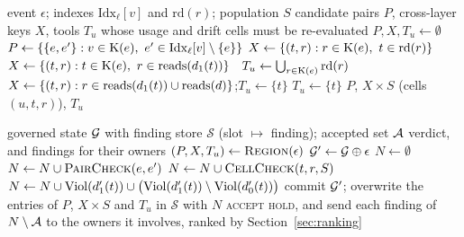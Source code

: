 \begin{algorithm}[t]
\caption{$\textsc{Region}(\epsilon)$: slots whose finding may change}\label{alg:region}
\begin{algorithmic}[1]
\Require event $\epsilon$; indexes $\mathrm{Idx}_\ell[v]$ and $\mathrm{rd}(r)$; population $S$
\Ensure candidate pairs $P$, cross-layer keys $X$, tools $T_u$ whose usage and drift cells must be re-evaluated
\State $P, X, T_u \gets \emptyset$
  \State $P \gets \{\{e, e'\} : v \in \mathrm{K}(e),\ e' \in \mathrm{Idx}_\ell[v] \setminus \{e\}\}$ 
   $X \gets \{(t, r) : r \in \mathrm{K}(e),\ t \in \mathrm{rd}(r)\}$
   $X \gets \{(t, r) : t \in \mathrm{K}(e),\ r \in \mathrm{reads}(d_1(t))\}$
  \Else\ $T_u \gets \bigcup_{r \in \mathrm{K}(e)} \mathrm{rd}(r)$
  \EndIf
{}
  \State $X \gets \{(t, r) : r \in \mathrm{reads}(d_1(t)) \cup \mathrm{reads}(d)\}$;\quad $T_u \gets \{t\}$
  \State $T_u \gets \{t\}$
\EndIf
\State \Return $P$, $X \times S$ (cells $(u, t, r)$), $T_u$
\end{algorithmic}
\end{algorithm}

\begin{algorithm}[t]
\caption{$\textsc{Admit}(\epsilon)$: exact admission of one event}\label{alg:admit}
\begin{algorithmic}[1]
\Require governed state $\mathcal{G}$ with finding store $\mathcal{S}$ (slot $\mapsto$ finding); accepted set $\mathcal{A}$
\Ensure verdict, and findings for their owners
\State $(P, X, T_u) \gets \textsc{Region}(\epsilon)$ 
\State $\mathcal{G}' \gets \mathcal{G} \oplus \epsilon$ 
\State $N \gets \emptyset$
  \State $N \gets N \cup \textsc{PairCheck}(e, e')$ 
\EndFor
{}
  \State $N \gets N \cup \textsc{CellCheck}(t, r, S)$ 
\EndFor
{}
  \State $N \gets N \cup \mathrm{Viol}(d'_1(t)) \cup \bigl(\mathrm{Viol}(d'_1(t)) \setminus \mathrm{Viol}(d'_0(t))\bigr)$ 
\EndFor
{}
  \State commit $\mathcal{G}'$; overwrite the entries of $P$, $X \times S$ and $T_u$ in $\mathcal{S}$ with $N$ \Comment{\eqref{eq:locality}}
  \State \Return \textsc{accept}
\Else
  \State \Return \textsc{hold}, and send each finding of $N \setminus \mathcal{A}$ to the owners it involves, ranked by Section~\ref{sec:ranking}
\EndIf
\end{algorithmic}
\end{algorithm}

